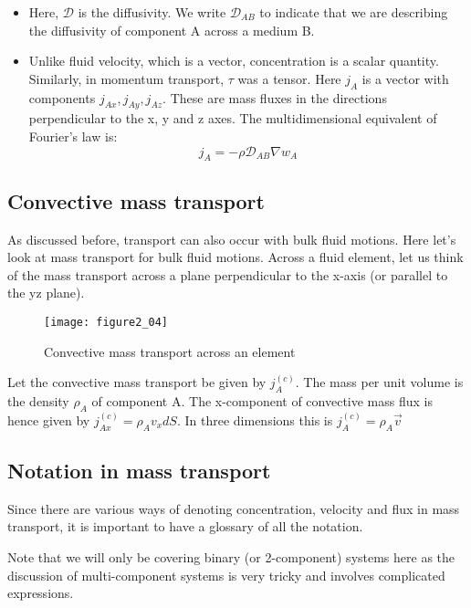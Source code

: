\begin{itemize}

    \item Here, $\mathscr{D}$ is the diffusivity. We write $\mathscr{D}_{AB}$ to indicate that we are describing the diffusivity of component A across a medium B.

    \item Unlike fluid velocity, which is a vector, concentration is a scalar quantity. Similarly, in momentum transport, $\tau$ was a tensor. Here $j_{A}$ is a vector with components $j_{Ax}, j_{Ay}, j_{Az}$. These are mass fluxes in the directions perpendicular to the x, y and z axes. The multidimensional equivalent of Fourier's law is: $$j_{A} = -\rho \mathscr{D}_{AB} \nabla w_{A}$$

\end{itemize}

\subsection{Convective mass transport}

As discussed before, transport can also occur with bulk fluid motions. Here let's look at mass transport for bulk fluid motions. Across a fluid element, let us think of the mass transport across a plane perpendicular to the x-axis (or parallel to the yz plane). 

\begin{figure}[h]
    \centering
    \texttt{[image: figure2\_04]}
    \caption{Convective mass transport across an element}
\end{figure}

Let the convective mass transport be given by $j_{A}^{(c)}$. The mass per unit volume is the density $\rho_{A}$ of component A. The x-component of convective mass flux is hence given by $j_{Ax}^{(c)} = \rho_{A} v_{x} dS$. In three dimensions this is $j_{A}^{(c)} = \rho_{A} \vec{v}$

\subsection{Notation in mass transport}

Since there are various ways of denoting concentration, velocity and flux in mass transport, it is important to have a glossary of all the notation. 

Note that we will only be covering binary (or 2-component) systems here as the discussion of multi-component systems is very tricky and involves complicated expressions.

